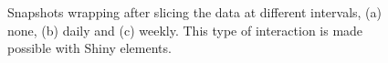 \begin{figure}

{\centering {}\newline{}\newline{}

}

\caption{Snapshots wrapping after slicing the  data at different intervals, (a) none, (b) daily and (c) weekly. This type of interaction is made possible with Shiny elements.}\label{fig:wrap-ped}
\end{figure}

